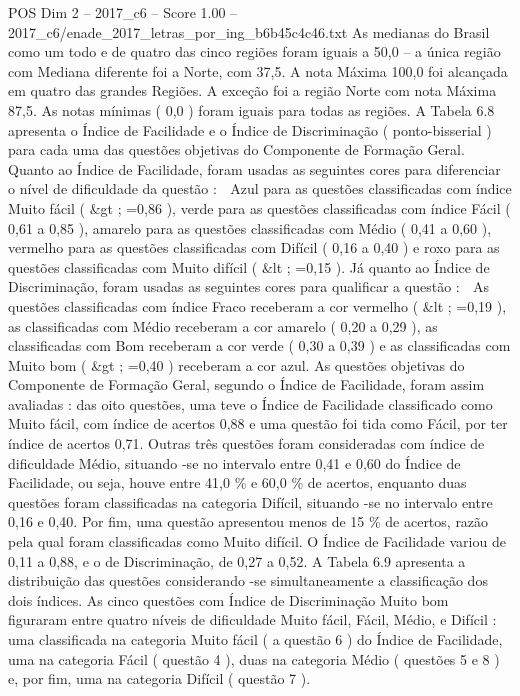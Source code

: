 \begin{textsample}{POS Dim 2 – 2017\_c6 – Score 1.00 – 2017\_c6/enade\_2017\_letras\_por\_ing\_b6b45c4c46.txt}
As medianas do Brasil como um todo e de quatro das cinco regiões foram iguais a 50,0 – a única região com Mediana diferente foi a Norte, com 37,5.
A nota Máxima 100,0 foi alcançada em quatro das grandes Regiões.
A exceção foi a região Norte com nota Máxima 87,5.
As notas mínimas ( 0,0 ) foram iguais para todas as regiões.
A Tabela 6.8 apresenta o Índice de Facilidade e o Índice de Discriminação ( ponto-bisserial ) para cada uma das questões objetivas do Componente de Formação Geral.
Quanto ao Índice de Facilidade, foram usadas as seguintes cores para diferenciar o nível de dificuldade da questão :  Azul para as questões classificadas com índice Muito fácil ( \&gt ; =0,86 ), verde para as questões classificadas com índice Fácil ( 0,61 a 0,85 ), amarelo para as questões classificadas com Médio ( 0,41 a 0,60 ), vermelho para as questões classificadas com Difícil ( 0,16 a 0,40 ) e roxo para as questões classificadas com Muito difícil ( \&lt ; =0,15 ).
Já quanto ao Índice de Discriminação, foram usadas as seguintes cores para qualificar a questão :  As questões classificadas com índice Fraco receberam a cor vermelho ( \&lt ; =0,19 ), as classificadas com Médio receberam a cor amarelo ( 0,20 a 0,29 ), as classificadas com Bom receberam a cor verde ( 0,30 a 0,39 ) e as classificadas com Muito bom ( \&gt ; =0,40 ) receberam a cor azul.
As questões objetivas do Componente de Formação Geral, segundo o Índice de Facilidade, foram assim avaliadas : das oito questões, uma teve o Índice de Facilidade classificado como Muito fácil, com índice de acertos 0,88 e uma questão foi tida como Fácil, por ter índice de acertos 0,71.
Outras três questões foram consideradas com índice de dificuldade Médio, situando -se no intervalo entre 0,41 e 0,60 do Índice de Facilidade, ou seja, houve entre 41,0 \% e 60,0 \% de acertos, enquanto duas questões foram classificadas na categoria Difícil, situando -se no intervalo entre 0,16 e 0,40.
Por fim, uma questão apresentou menos de 15 \% de acertos, razão pela qual foram classificadas como Muito difícil.
O Índice de Facilidade variou de 0,11 a 0,88, e o de Discriminação, de 0,27 a 0,52.
A Tabela 6.9 apresenta a distribuição das questões considerando -se simultaneamente a classificação dos dois índices.
As cinco questões com Índice de Discriminação Muito bom figuraram entre quatro níveis de dificuldade Muito fácil, Fácil, Médio, e Difícil : uma classificada na categoria Muito fácil ( a questão 6 ) do Índice de Facilidade, uma na categoria Fácil ( questão 4 ), duas na categoria Médio ( questões 5 e 8 ) e, por fim, uma na categoria Difícil ( questão 7 ).

\end{textsample}
